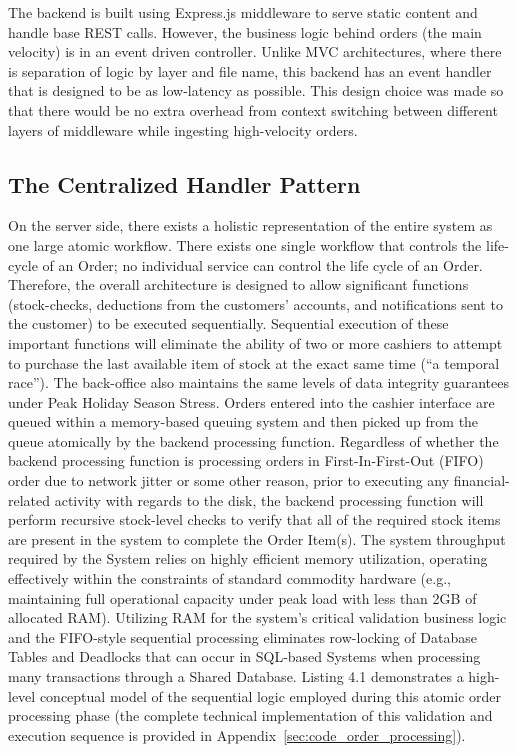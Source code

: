 The backend is built using Express.js \cite{express} middleware to serve static content and handle base REST calls. However, the business logic behind orders (the main velocity) is in an event driven controller. Unlike MVC architectures, where there is separation of logic by layer and file name, this backend has an event handler that is designed to be as low-latency as possible. This design choice was made so that there would be no extra overhead from context switching between different layers of middleware while ingesting high-velocity orders.

\subsection{The Centralized Handler Pattern}

On the server side, there exists a holistic representation of the entire system as one large atomic workflow. There exists one single workflow that controls the life-cycle of an Order; no individual service can control the life cycle of an Order. 
Therefore, the overall architecture is designed to allow significant functions (stock-checks, deductions from the customers' accounts, and notifications sent to the customer) to be executed sequentially. Sequential execution of these important functions will eliminate the ability of two or more cashiers to attempt to purchase the last available item of stock at the exact same time (``a temporal race''). 
The back-office also maintains the same levels of data integrity guarantees under Peak Holiday Season Stress. Orders entered into the cashier interface are queued within a memory-based queuing system and then picked up from the queue atomically by the backend processing function. Regardless of whether the backend processing function is processing orders in First-In-First-Out (FIFO) order due to network jitter or some other reason, prior to executing any financial-related activity with regards to the disk, the backend processing function will perform recursive stock-level checks to verify that all of the required stock items are present in the system to complete the Order Item(s). The system throughput required by the System relies on highly efficient memory utilization, operating effectively within the constraints of standard commodity hardware (e.g., maintaining full operational capacity under peak load with less than 2GB of allocated RAM). Utilizing RAM for the system's critical validation business logic and the FIFO-style sequential processing eliminates row-locking of Database Tables and Deadlocks that can occur in SQL-based Systems when processing many transactions through a Shared Database. Listing 4.1 demonstrates a high-level conceptual model of the sequential logic employed during this atomic order processing phase (the complete technical implementation of this validation and execution sequence is provided in Appendix~\ref{sec:code_order_processing}).

